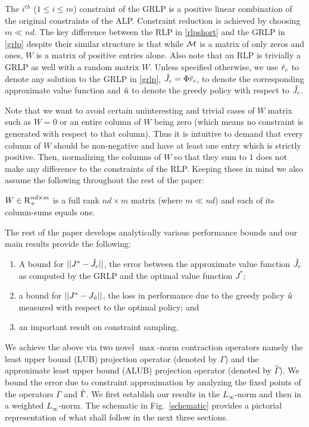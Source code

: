 The $i^{th}$ ($1\leq i\leq m$) constraint of the GRLP is a positive linear combination of the original constraints of the ALP. Constraint reduction is achieved by choosing $m\ll nd$. The key difference between the RLP in \eqref{rlpshort} and the GRLP in \eqref{grlp} despite their similar structure is that while $\mathcal{M}$ is a matrix of only zeros and ones, $W$ is a matrix of positive entries alone. Also note that an RLP is trivially a GRLP as well with a random matrix $W$. Unless specified otherwise, we use $\hat{r}_c$ to denote any solution to the GRLP in \eqref{grlp}, $\hat{J}_c=\Phi \hat{r}_c$, to denote the corresponding approximate value function and $\hat{u}$ to denote the greedy policy with respect to $\hat{J}_c$.\par
Note that we want to avoid certain uninteresting and trivial cases of $W$ matrix such as $W=0$ or an entire column of $W$ being zero (which means no constraint is generated with respect to that column). Thus it is intuitive to demand that every column of $W$ should be non-negative and have at least one entry which is strictly positive. Then, normalizing the columns of $W$ so that they sum to $1$ does not make any difference to the constraints of the RLP. Keeping these in mind we also assume the following throughout the rest of the paper:
\begin{assumption}\label{wassump}
$W \in \mathrm{R}^{nd\times m}_+$ is a full rank $nd\times m$  matrix (where $m\ll nd$) and each of its column-sums equals one.
\end{assumption}
\begin{comment}
The above assumption is just a technical condition that eliminates uninteresting choices such as $W=0$ or cases when certain columns of $W$ have all zeros, which implies that the corresponding column generates no constraint.
\end{comment}

The rest of the paper develops analytically various performance bounds and our main results provide the following:
\begin{enumerate}
\item A bound for $||J^*-\hat{J}_c||$, the error between the approximate value function $\hat{J}_c$ as computed by the GRLP and the optimal value function $J^*$;
\item a bound for $||J^*-J_{\hat{u}}||$, the loss in performance due to the greedy policy $\hat{u}$ measured with respect to the optimal policy; and
\item an important result on constraint sampling. 
\end{enumerate}
We achieve the above via two novel $\max$-norm contraction operators namely the least upper bound (LUB) projection operator (denoted by $\Gamma$) and the approximate least upper bound (ALUB) projection operator (denoted by $\hat{\Gamma}$). We bound the error due to constraint approximation by analyzing the fixed points of the operators $\Gamma$ and $\hat{\Gamma}$. We first establish our results in the $L_\infty$-norm and then in a weighted $L_\infty$-norm. The schematic in Fig.~\ref{schematic} provides a pictorial representation of what shall follow in the next three sections.
\FloatBarrier

